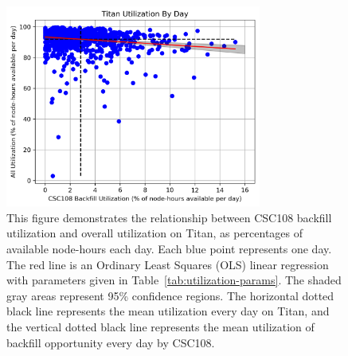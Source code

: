 \begin{figure}
  \includegraphics[width=0.75\textwidth]{images/linfit-utilization-by-true-day-all.png}
\caption{This figure demonstrates the relationship between CSC108 backfill
utilization and overall utilization on Titan, as percentages of available
node-hours each day. Each blue point represents one day. The red line is an
Ordinary Least Squares (OLS) linear regression with parameters given in
Table~\ref{tab:utilization-params}. The shaded gray areas represent 95\%
confidence regions. The horizontal dotted black line represents the mean
utilization every day on Titan, and the vertical dotted black line represents
the mean utilization of backfill opportunity every day by CSC108.}
\label{fig:utilization-all}
\end{figure}


